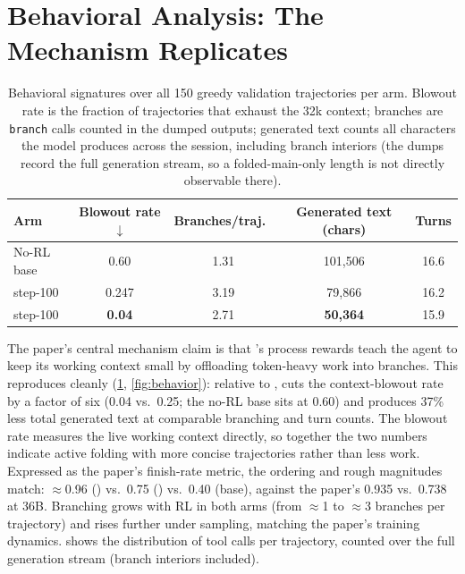 \section{Behavioral Analysis: The Mechanism Replicates}
\label{sec:behavior}

\begin{table}[t]
\centering
\small
\begin{tabular}{lcccc}
\toprule
Arm & Blowout rate $\downarrow$ & Branches/traj.\ & Generated text (chars) & Turns \\
\midrule
No-RL base & 0.60 & 1.31 & 101{,}506 & 16.6 \\
\grpo{} step-100 & 0.247 & 3.19 & 79{,}866 & 16.2 \\
\foldgrpo{} step-100 & \textbf{0.04} & 2.71 & \textbf{50{,}364} & 15.9 \\
\bottomrule
\end{tabular}
\caption{Behavioral signatures over all 150 greedy validation trajectories per arm. Blowout
rate is the fraction of trajectories that exhaust the 32k context; branches are
\texttt{branch} calls counted in the dumped outputs; generated text counts all characters the
model produces across the session, including branch interiors (the dumps record the full
generation stream, so a folded-main-only length is not directly observable there).}
\label{tab:behavior}
\end{table}

The paper's central mechanism claim is that \foldgrpo{}'s process rewards teach the agent to
keep its working context small by offloading token-heavy work into branches. This reproduces
cleanly (\cref{tab:behavior}, \cref{fig:behavior}): relative to \grpo{}, \foldgrpo{} cuts the
context-blowout rate by a factor of six (0.04 vs.\ 0.25; the no-RL base sits at 0.60) and produces
37\% less total generated text at comparable branching and turn counts. The blowout rate
measures the live working context directly, so together the two numbers indicate active
folding with more concise trajectories rather than less work. Expressed as the paper's finish-rate metric, the ordering and rough magnitudes match:
$\approx$0.96 (\foldgrpo{}) vs.\ 0.75 (\grpo{}) vs.\ 0.40 (base), against the paper's 0.935
vs.\ 0.738 at 36B. Branching grows with RL in both arms (from $\approx$1 to $\approx$3 branches
per trajectory) and rises further under sampling, matching the paper's training dynamics.
 shows the distribution of tool calls per trajectory, counted over the full
generation stream (branch interiors included).

